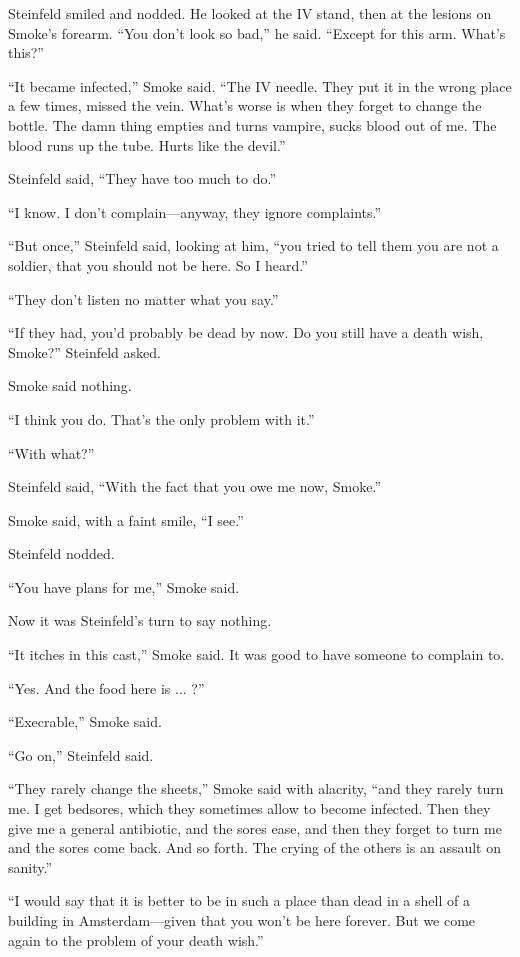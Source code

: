 Steinfeld smiled and nodded. He looked at the IV stand, then at the lesions on Smoke's forearm. ``You don't look so bad,'' he said. ``Except for this arm. What's this?''

``It became infected,'' Smoke said. ``The IV needle. They put it in the wrong place a few times, missed the vein. What's worse is when they forget to change the bottle. The damn thing empties and turns vampire, sucks blood out of me. The blood runs up the tube. Hurts like the devil.''

Steinfeld said, ``They have too much to do.''

``I know. I don't complain---anyway, they ignore complaints.''

``But once,'' Steinfeld said, looking at him, ``you tried to tell them you are not a soldier, that you should not be here. So I heard.''

``They don't listen no matter what you say.''

``If they had, you'd probably be dead by now. Do you still have a death wish, Smoke?'' Steinfeld asked.

Smoke said nothing.

``I think you do. That's the only problem with it.''

``With what?''

Steinfeld said, ``With the fact that you owe me now, Smoke.''

Smoke said, with a faint smile, ``I see.''

Steinfeld nodded.

``You have plans for me,'' Smoke said.

Now it was Steinfeld's turn to say nothing.

``It itches in this cast,'' Smoke said. It was good to have someone to complain to.

``Yes. And the food here is ... ?''

``Execrable,'' Smoke said.

``Go on,'' Steinfeld said.

``They rarely change the sheets,'' Smoke said with alacrity, ``and they rarely turn me. I get bedsores, which they sometimes allow to become infected. Then they give me a general antibiotic, and the sores ease, and then they forget to turn me and the sores come back. And so forth. The crying of the others is an assault on sanity.''

``I would say that it is better to be in such a place than dead in a shell of a building in Amsterdam---given that you won't be here forever. But we come again to the problem of your death wish.''

